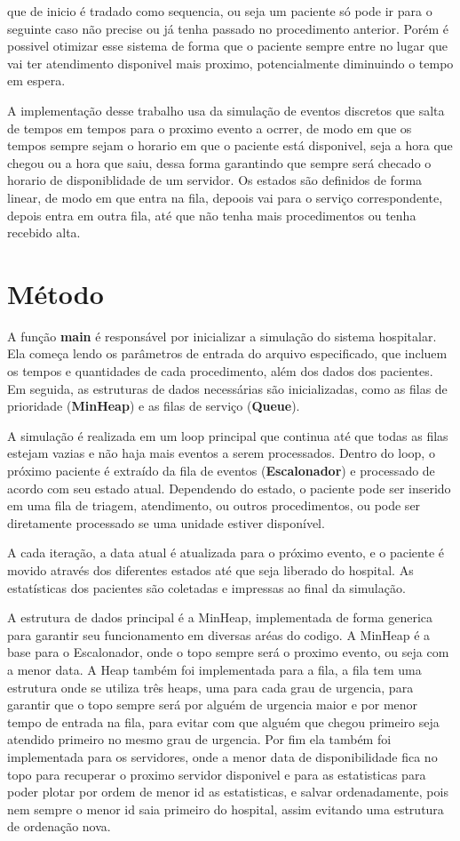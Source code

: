 \documentclass[a4paper,12pt]{article}
\begin{document}
que de inicio é tradado como sequencia, ou seja um paciente só pode ir para o seguinte caso não precise ou já tenha passado no procedimento anterior.
Porém é possivel otimizar esse sistema de forma que o paciente sempre entre no lugar que vai ter atendimento disponivel mais proximo, 
potencialmente diminuindo o tempo em espera. 

A implementação desse trabalho usa da simulação de eventos discretos que salta de tempos em tempos para o proximo evento a ocrrer, de modo em que 
os tempos sempre sejam o horario em que o paciente está disponivel, seja a hora que chegou ou a hora que saiu, 
dessa forma garantindo que sempre será checado o horario de disponiblidade de um servidor. 
Os estados são definidos de forma linear, de modo em que entra na fila, depoois vai para o serviço correspondente, depois entra em outra fila, 
até que não tenha mais procedimentos ou tenha recebido alta.

\section{Método}
\hspace*{1cm}
A função \textbf{main} é responsável por inicializar a simulação do sistema hospitalar. 
Ela começa lendo os parâmetros de entrada do arquivo especificado, que incluem os tempos e quantidades de cada procedimento, 
além dos dados dos pacientes. Em seguida, as estruturas de dados necessárias são inicializadas, 
como as filas de prioridade (\textbf{MinHeap}) e as filas de serviço (\textbf{Queue}).

A simulação é realizada em um loop principal que continua até que todas as filas estejam vazias e não haja mais eventos a serem processados. 
Dentro do loop, o próximo paciente é extraído da fila de eventos (\textbf{Escalonador}) e processado de acordo com seu estado atual. 
Dependendo do estado, o paciente pode ser inserido em uma fila de triagem, atendimento, 
ou outros procedimentos, ou pode ser diretamente processado se uma unidade estiver disponível.

A cada iteração, a data atual é atualizada para o próximo evento, 
e o paciente é movido através dos diferentes estados até que seja liberado do hospital. 
As estatísticas dos pacientes são coletadas e impressas ao final da simulação.

A estrutura de dados principal é a MinHeap, implementada de forma generica para garantir seu funcionamento em diversas aréas do codigo.
A MinHeap é a base para o Escalonador, onde o topo sempre será o proximo evento, ou seja com a menor data. A Heap também foi implementada para a fila,
a fila tem uma estrutura onde se utiliza três heaps, uma para cada grau de urgencia, para garantir que o topo sempre será por alguém de urgencia maior e por menor tempo de entrada na fila,
para evitar com que alguém que chegou primeiro seja atendido primeiro no mesmo grau de urgencia. Por fim ela também foi implementada para os servidores, 
onde a menor data de disponibilidade fica no topo para recuperar o proximo servidor disponivel e para as estatisticas para poder plotar por ordem de menor id as estatisticas,
e salvar ordenadamente, pois nem sempre o menor id saia primeiro do hospital, assim evitando uma estrutura de ordenação nova.
\end{document}
